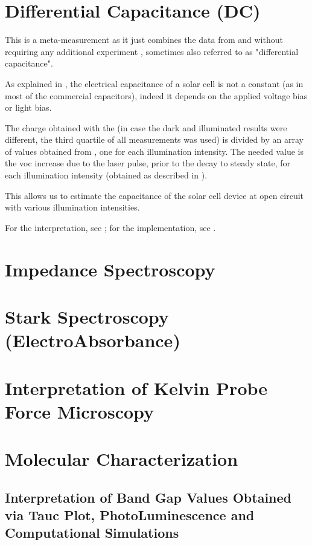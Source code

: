 \section{Differential Capacitance (DC)}

	This is a meta-measurement as it just combines the data from  and  without requiring any additional experiment \cite{ORegan2005,ORegan2006,Shuttle2008}, sometimes also referred to as "differential capacitance".

	As explained in , the electrical capacitance of a solar cell is not a constant (as in most of the commercial capacitors), indeed it depends on the applied voltage bias or light bias.

	The charge obtained with the  (in case the dark and illuminated results were different, the third quartile of all  measurements was used) is divided by an array of values obtained from , one for each illumination intensity. The needed value is the \gls{voc} increase due to the laser pulse, prior to the decay to steady state, for each illumination intensity (obtained as described in ).

	This allows us to estimate the capacitance of the solar cell device at open circuit with various illumination intensities.

	For the interpretation, see ; for the implementation, see .

\section{Impedance Spectroscopy}

\section{Stark Spectroscopy (ElectroAbsorbance)}

\section{Interpretation of Kelvin Probe Force Microscopy}\label{interpretation_kpfm}

\section{Molecular Characterization}
\subsection{Interpretation of Band Gap Values Obtained via Tauc Plot, PhotoLuminescence and Computational Simulations}\label{interpretation_bg}

